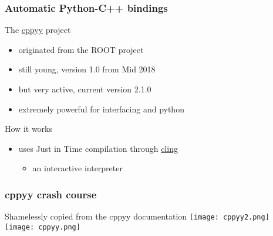 \begin{frame}
  \frametitle{Automatic Python-C++ bindings}
  \begin{block}{The {\color{blue!50!white} \href{https://cppyy.readthedocs.io}{cppyy}} project}
    \begin{itemize}
    \item originated from the ROOT project
    \item still young, version 1.0 from Mid 2018
    \item but very active,  current version 2.1.0
    \item extremely powerful for interfacing \cpp and python
    \end{itemize}
  \end{block}
  \begin{block}{How it works}
    \begin{itemize}
    \item uses Just in Time compilation through {\color{blue!50!black} \href{https://github.com/vgvassilev/cling}{cling}}
      \begin{itemize}
      \item an interactive \cpp interpreter
      \end{itemize}
    \end{itemize}
  \end{block}
\end{frame}

\begin{frame}
  \frametitle{cppyy crash course}
  Shamelessly copied from the cppyy documentation
  \texttt{[image: cppyy2.png]}
  \texttt{[image: cppyy.png]}
\end{frame}
